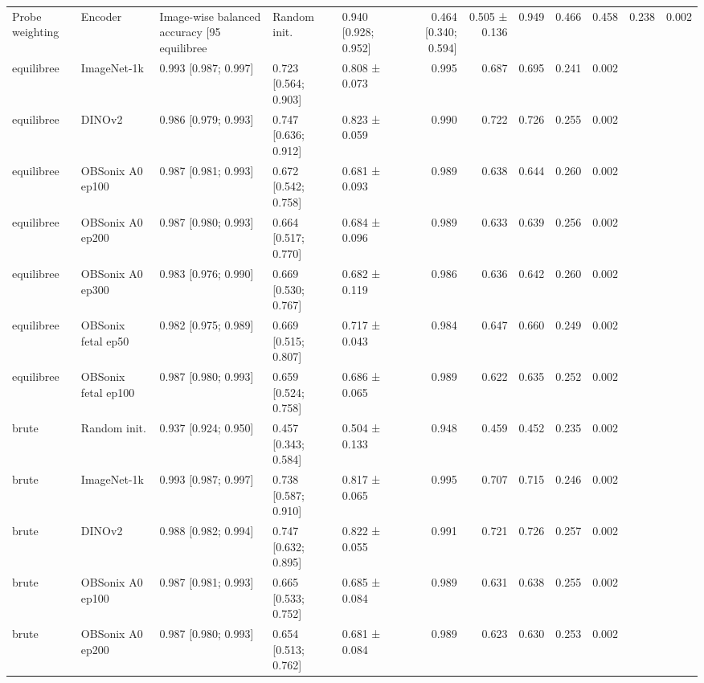 \begin{tabular}{lllllrrrrr}
\toprule
Probe weighting & Encoder & Image-wise balanced accuracy [95%
\midrule
equilibree & Random init. & 0.940 [0.928; 0.952] & 0.464 [0.340; 0.594] & 0.505 ± 0.136 & 0.949 & 0.466 & 0.458 & 0.238 & 0.002 \\
equilibree & ImageNet-1k & 0.993 [0.987; 0.997] & 0.723 [0.564; 0.903] & 0.808 ± 0.073 & 0.995 & 0.687 & 0.695 & 0.241 & 0.002 \\
equilibree & DINOv2 & 0.986 [0.979; 0.993] & 0.747 [0.636; 0.912] & 0.823 ± 0.059 & 0.990 & 0.722 & 0.726 & 0.255 & 0.002 \\
equilibree & OBSonix A0 ep100 & 0.987 [0.981; 0.993] & 0.672 [0.542; 0.758] & 0.681 ± 0.093 & 0.989 & 0.638 & 0.644 & 0.260 & 0.002 \\
equilibree & OBSonix A0 ep200 & 0.987 [0.980; 0.993] & 0.664 [0.517; 0.770] & 0.684 ± 0.096 & 0.989 & 0.633 & 0.639 & 0.256 & 0.002 \\
equilibree & OBSonix A0 ep300 & 0.983 [0.976; 0.990] & 0.669 [0.530; 0.767] & 0.682 ± 0.119 & 0.986 & 0.636 & 0.642 & 0.260 & 0.002 \\
equilibree & OBSonix fetal ep50 & 0.982 [0.975; 0.989] & 0.669 [0.515; 0.807] & 0.717 ± 0.043 & 0.984 & 0.647 & 0.660 & 0.249 & 0.002 \\
equilibree & OBSonix fetal ep100 & 0.987 [0.980; 0.993] & 0.659 [0.524; 0.758] & 0.686 ± 0.065 & 0.989 & 0.622 & 0.635 & 0.252 & 0.002 \\
brute & Random init. & 0.937 [0.924; 0.950] & 0.457 [0.343; 0.584] & 0.504 ± 0.133 & 0.948 & 0.459 & 0.452 & 0.235 & 0.002 \\
brute & ImageNet-1k & 0.993 [0.987; 0.997] & 0.738 [0.587; 0.910] & 0.817 ± 0.065 & 0.995 & 0.707 & 0.715 & 0.246 & 0.002 \\
brute & DINOv2 & 0.988 [0.982; 0.994] & 0.747 [0.632; 0.895] & 0.822 ± 0.055 & 0.991 & 0.721 & 0.726 & 0.257 & 0.002 \\
brute & OBSonix A0 ep100 & 0.987 [0.981; 0.993] & 0.665 [0.533; 0.752] & 0.685 ± 0.084 & 0.989 & 0.631 & 0.638 & 0.255 & 0.002 \\
brute & OBSonix A0 ep200 & 0.987 [0.980; 0.993] & 0.654 [0.513; 0.762] & 0.681 ± 0.084 & 0.989 & 0.623 & 0.630 & 0.253 & 0.002 \\

\end{tabular}
